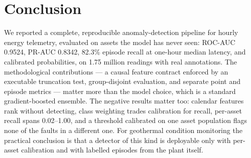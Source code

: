 \documentclass[conference]{IEEEtran}
\begin{document}
\section{Conclusion}

We reported a complete, reproducible anomaly-detection pipeline for hourly energy telemetry, evaluated
on assets the model has never seen: ROC-AUC 0.9524, PR-AUC 0.8342, 82.3\% episode recall at one-hour
median latency, and calibrated probabilities, on 1.75 million readings with real annotations. The
methodological contributions --- a causal feature contract enforced by an executable truncation test,
group-disjoint evaluation, and separate point and episode metrics --- matter more than the model
choice, which is a standard gradient-boosted ensemble. The negative results matter too: calendar
features rank without detecting, class weighting trades calibration for recall, per-asset recall
spans 0.02--1.00, and a threshold calibrated on one asset population flags none of the faults in a
different one. For geothermal condition monitoring the practical conclusion is that a detector of this
kind is deployable only with per-asset calibration and with labelled episodes from the plant itself.
\end{document}
